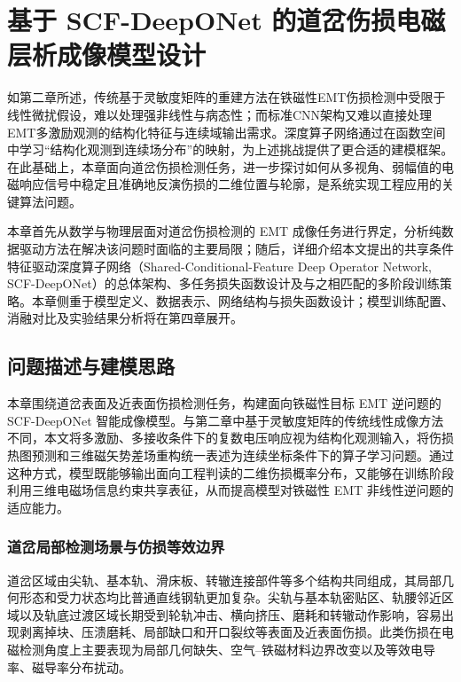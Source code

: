 \chapter{基于 SCF-DeepONet 的道岔伤损电磁层析成像模型设计}

如第二章所述，传统基于灵敏度矩阵的重建方法在铁磁性EMT伤损检测中受限于线性微扰假设，难以处理强非线性与病态性；而标准CNN架构又难以直接处理EMT多激励观测的结构化特征与连续域输出需求。深度算子网络通过在函数空间中学习``结构化观测到连续场分布''的映射，为上述挑战提供了更合适的建模框架。在此基础上，本章面向道岔伤损检测任务，进一步探讨如何从多视角、弱幅值的电磁响应信号中稳定且准确地反演伤损的二维位置与轮廓，是系统实现工程应用的关键算法问题。

本章首先从数学与物理层面对道岔伤损检测的 EMT 成像任务进行界定，分析纯数据驱动方法在解决该问题时面临的主要局限；随后，详细介绍本文提出的共享条件特征驱动深度算子网络（Shared-Conditional-Feature Deep Operator Network, SCF-DeepONet）的总体架构、多任务损失函数设计及与之相匹配的多阶段训练策略。本章侧重于模型定义、数据表示、网络结构与损失函数设计；模型训练配置、消融对比及实验结果分析将在第四章展开。

\section{问题描述与建模思路}
\label{sec:problem_formulation}

本章围绕道岔表面及近表面伤损检测任务，构建面向铁磁性目标 EMT 逆问题的 SCF-DeepONet 智能成像模型。与第二章中基于灵敏度矩阵的传统线性成像方法不同，本文将多激励、多接收条件下的复数电压响应视为结构化观测输入，将伤损热图预测和三维磁矢势差场重构统一表述为连续坐标条件下的算子学习问题。通过这种方式，模型既能够输出面向工程判读的二维伤损概率分布，又能够在训练阶段利用三维电磁场信息约束共享表征，从而提高模型对铁磁性 EMT 非线性逆问题的适应能力。

\subsection{道岔局部检测场景与仿损等效边界}
\label{subsec:turnout_scene_equivalence}

道岔区域由尖轨、基本轨、滑床板、转辙连接部件等多个结构共同组成，其局部几何形态和受力状态均比普通直线钢轨更加复杂。尖轨与基本轨密贴区、轨腰邻近区域以及轨底过渡区域长期受到轮轨冲击、横向挤压、磨耗和转辙动作影响，容易出现剥离掉块、压溃磨耗、局部缺口和开口裂纹等表面及近表面伤损。此类伤损在电磁检测角度上主要表现为局部几何缺失、空气--铁磁材料边界改变以及等效电导率、磁导率分布扰动。

